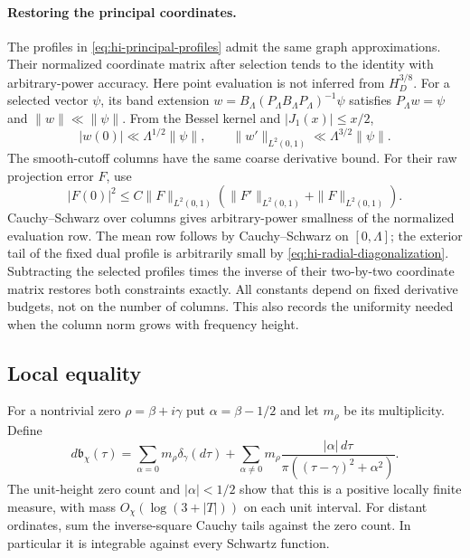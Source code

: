 \paragraph{Restoring the principal coordinates.}
The profiles in \eqref{eq:hi-principal-profiles} admit the same graph
approximations. Their normalized coordinate matrix after selection tends
to the identity with arbitrary-power accuracy. Here point evaluation is
not inferred from $H_D^{3/8}$. For a selected vector $\psi$, its band
extension $w=B_\Lambda(P_\Lambda B_\Lambda P_\Lambda)^{-1}\psi$
satisfies $P_\Lambda w=\psi$ and $\|w\|\ll\|\psi\|$.
From the Bessel kernel and $|J_1(x)|\le x/2$,
\[
 |w(0)|\ll\Lambda^{1/2}\|\psi\|,
 \qquad \|w'\|_{L^2(0,1)}\ll\Lambda^{3/2}\|\psi\|.
\]
The smooth-cutoff columns have the same coarse derivative bound.
For their raw projection error $F$, use
\[
 |F(0)|^2\le C\|F\|_{L^2(0,1)}
                (\|F'\|_{L^2(0,1)}+\|F\|_{L^2(0,1)}).
\]
Cauchy--Schwarz over columns gives arbitrary-power smallness of the
normalized evaluation row. The mean row follows by Cauchy--Schwarz on
$[0,\Lambda]$; the exterior tail of the fixed dual profile is arbitrarily
small by \eqref{eq:hi-radial-diagonalization}. Subtracting the selected
profiles times the inverse of their two-by-two coordinate matrix restores
both constraints exactly. All constants depend on fixed derivative
budgets, not on the number of columns. This also records the uniformity
needed when the column norm grows with frequency height.

\subsection{Local equality}

For a nontrivial zero $\rho=\beta+i\gamma$ put
$\alpha=\beta-1/2$ and let $m_\rho$ be its multiplicity. Define
\begin{equation}\label{eq:hi-zero-measure}
 d\mathfrak b_\chi(\tau)=
 \sum_{\alpha=0}m_\rho\delta_\gamma(d\tau)
 +\sum_{\alpha\ne0}m_\rho
       \frac{|\alpha|\,d\tau}{\pi((\tau-\gamma)^2+\alpha^2)}.
\end{equation}
The unit-height zero count and $|\alpha|<1/2$ show that this is a
positive locally finite measure, with mass $O_\chi(\log(3+|T|))$ on
each unit interval. For distant ordinates, sum the inverse-square Cauchy
tails against the zero count. In particular it is integrable against
every Schwartz function.

